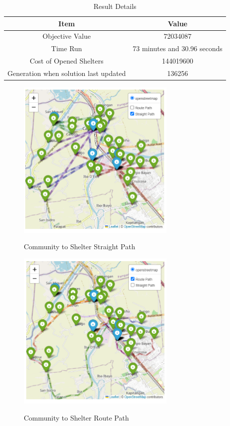 	\begin{table}[h!]
		\centering
		\caption{Result Details}
		\label{resdetails}
		\begin{tabular}{|c|c|}
			\hline
			\textbf{Item} & \textbf{Value} \\ \hline
			Objective Value & 72034087 \\ 
			Time Run  & 73 minutes and 30.96 seconds \\ 
			Cost of Opened Shelters & 144019600 \\ 
			Generation when solution last updated & 136256 \\ \hline
		\end{tabular}
	\end{table}
	
	\begin{figure}[h!]
		\caption{Community to Shelter Straight Path}
		\centering
		\includegraphics[width=3in]{Chapter 4/straight path}
		\label{straightpath}
	\end{figure}
	
	\begin{figure}[h!]
		\caption{Community to Shelter Route Path}
		\centering
		\includegraphics[width=3in]{Chapter 4/route path}
		\label{routepath}
	\end{figure}
	
